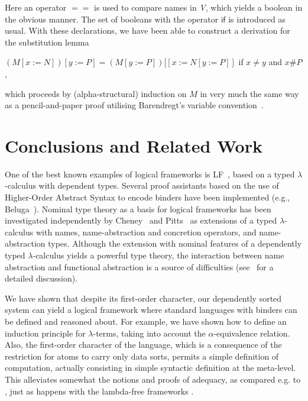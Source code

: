 \documentclass[copyright,creativecommons]{eptcs}
\newcounter{s}
\newcommand{\fresh}[2]{#1 \# #2}
\newcommand{\name}{\textsl{V}}
\begin{document}
Here an operator $\mathsf{==}$ is used to compare names in \name, which yields a boolean in the obvious manner. The set of booleans with the operator $\mathsf{if}$ is introduced as usual.
With these declarations, we have been able to construct a derivation for the substitution lemma

$(M[x := N])[y := P] = (M[y := P])[[x := N[y := P]]$ if $x \not = y$ and $\fresh{x}{P}$,

\noindent which proceeds by (alpha-structural) induction on $M$ in very much the same way as a pencil-and-paper proof utilising Barendregt's variable convention~\cite{BarendregtH:lamcss}.

\section{Conclusions and Related Work}
\label{section:related-work}

One of the best known examples of logical frameworks is LF~\cite{harper:fradl}, based on a typed $\lambda$-calculus with
dependent types. 
Several proof assistants based on the use of Higher-Order Abstract Syntax to encode binders have been implemented (e.g., Beluga~\cite{Beluga}).
Nominal type theory as a basis for logical frameworks has been investigated independently by Cheney~\cite{CheneyJ:sntt,CheneyJ:depntt} and Pitts~\cite{PittsA:deptta} as extensions of a typed $\lambda$-calculus with names, name-abstraction and concretion operators, and name-abstraction types. 
Although the extension with nominal features of a dependently typed $\lambda$-calculus yields a powerful type theory,  the interaction between name abstraction and functional abstraction is a source of difficulties (see~\cite{CheneyJ:sntt} for a detailed discussion). 

We have shown that despite its first-order character, our dependently sorted system can yield a logical framework where standard languages with binders can be defined and reasoned about. For example, we have shown how to define an induction principle for $\lambda$-terms,  taking into account the  $\alpha$-equivalence relation.  
Also, the first-order character of the language, which is a consequence of the restriction for atoms to carry only data sorts, permits a simple definition of computation, actually consisting in simple syntactic definition at the meta-level. This alleviates somewhat the notions and proofs of adequacy, as compared e.g. to \cite{harper:fradl}, just as happens with the lambda-free frameworks \cite{AdamsR:lamfree}.
\end{document}
